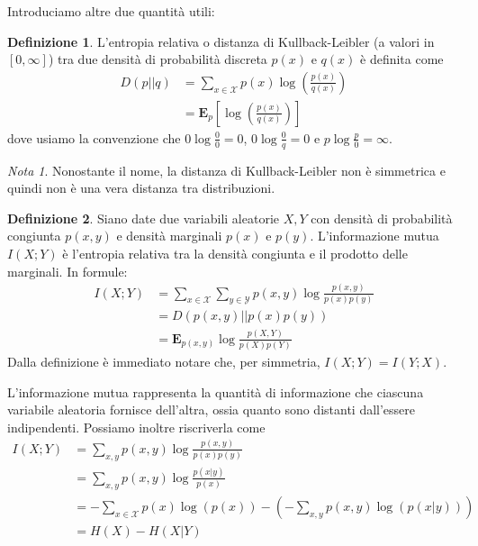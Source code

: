\documentclass[a4paper,11pt]{book}
\theoremstyle{plain}
\theoremstyle{definition}
\newtheorem{defn}{Definizione}[chapter]
\theoremstyle{remark}
\newtheorem*{nota}{Nota}
\begin{document}
Introduciamo altre due quantità utili:
\begin{defn}
	L'entropia relativa o distanza di Kullback-Leibler (a valori in $[0,\infty]$) tra due densità di probabilità discreta $p(x)$ e $q(x)$ è definita come
	\begin{equation*}
		\begin{split}
		D(p||q) & = \sum_{x\in \mathcal{X}}{p(x)\log\left(\frac{p(x)}{q(x)}\right)}\\
			& = \mathbf{E}_p\left[\log\left(\frac{p(x)}{q(x)}\right)\right]
		\end{split}
	\end{equation*}
	dove usiamo la convenzione che $0\log\frac{0}{0}=0$, $0\log\frac{0}{q} = 0$ e $p\log\frac{p}{0}= \infty$.
\end{defn}
\begin{nota}
	Nonostante il nome, la distanza di Kullback-Leibler non è simmetrica e quindi non è una vera distanza tra distribuzioni.
\end{nota}
\begin{defn}
	Siano date due variabili aleatorie $X,Y$ con densità di probabilità congiunta $p(x,y)$ e densità marginali $p(x)$ e $p(y)$. L'informazione mutua $I(X;Y)$ è l'entropia relativa tra la densità congiunta e il prodotto delle marginali. In formule:
	\begin{equation*}
		\begin{split}
		I(X;Y) & = \sum_{x\in \mathcal{X}}\sum_{y\in \mathcal{Y}}{p(x,y)\log\frac{p(x,y)}{p(x)p(y)}}\\
		& = D(p(x,y)||p(x)p(y)) \\
		& = \mathbf{E}_{p(x,y)}\log\frac{p(X,Y)}{p(X)p(Y)}
		\end{split}
	\end{equation*}
	Dalla definizione è immediato notare che, per simmetria, $I(X;Y)=I(Y;X)$.
\end{defn}
L'informazione mutua rappresenta la quantità di informazione che ciascuna variabile aleatoria fornisce dell'altra, ossia quanto sono distanti dall'essere indipendenti.
Possiamo inoltre riscriverla come
\begin{equation*}
	\begin{split}
	I(X;Y) & = \sum_{x,y}{p(x,y)\log\frac{p(x,y)}{p(x)p(y)}}\\
	& = \sum_{x,y}{p(x,y)\log\frac{p(x|y)}{p(x)}}\\
	& = -\sum_{x\in \mathcal{X}}{p(x)\log(p(x))}-\left(-\sum_{x,y}{p(x,y)\log(p(x|y))}\right)\\
	& = H(X) - H(X|Y)
	\end{split}
\end{equation*}
\end{document}
